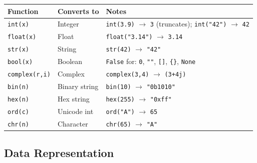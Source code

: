 \documentclass[oneside]{book}
\begin{document}
\begin{center}
\begin{tabularx}{\linewidth}{lXl}
\toprule
\textbf{Function} & \textbf{Converts to} & \textbf{Notes} \\
\midrule
\texttt{int(x)}       & Integer   & \texttt{int(3.9)} $\to$ \texttt{3} (truncates); \texttt{int("42")} $\to$ \texttt{42} \\
\texttt{float(x)}     & Float     & \texttt{float("3.14")} $\to$ \texttt{3.14} \\
\texttt{str(x)}       & String    & \texttt{str(42)} $\to$ \texttt{"42"} \\
\texttt{bool(x)}      & Boolean   & \texttt{False} for: \texttt{0}, \texttt{""}, \texttt{[]}, \texttt{\{\}}, \texttt{None} \\
\texttt{complex(r,i)} & Complex   & \texttt{complex(3,4)} $\to$ \texttt{(3+4j)} \\
\texttt{bin(n)}       & Binary string  & \texttt{bin(10)} $\to$ \texttt{"0b1010"} \\
\texttt{hex(n)}       & Hex string     & \texttt{hex(255)} $\to$ \texttt{"0xff"} \\
\texttt{ord(c)}       & Unicode int    & \texttt{ord("A")} $\to$ \texttt{65} \\
\texttt{chr(n)}       & Character      & \texttt{chr(65)} $\to$ \texttt{"A"} \\
\bottomrule
\end{tabularx}
\end{center}

\subsection*{Data Representation}

\end{document}
